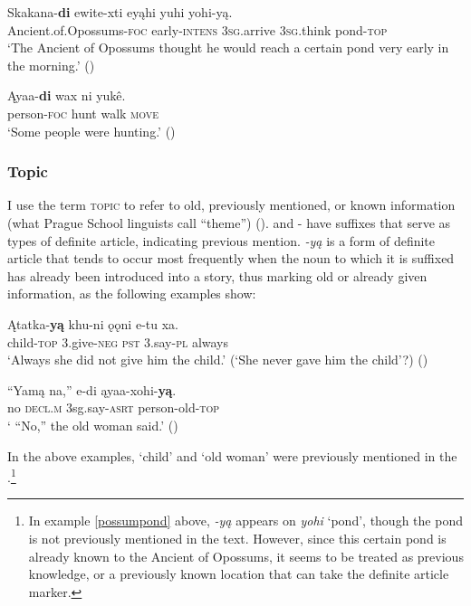 \documentclass[output=paper]{LSP/langsci}
\begin{document}
\ea\label{possumpond}
\gll 	Skakana-\textbf{di} ewite-xti eyąhi yuhi yohi-y\k{a}. \\
	Ancient.of.Opossums-\textsc{foc} early-\textsc{intens} \textsc{3sg}.arrive \textsc{3sg}.think pond-\textsc{top}\\
\glt `The Ancient of Opossums thought he would reach a certain pond very early in the morning.' (\citealt[26]{DorseySwanton1912})
\z

\ea
\gll	Ąyaa-\textbf{di} wax ni yukê. \\
	person-\textsc{foc} hunt walk \textsc{move}\\
\glt `Some people were hunting.' (\citealt[65]{DorseySwanton1912})
\z

\subsubsection{Topic}

I use the term \textsc{topic} to refer to old, previously mentioned, or known information (what Prague School linguists call “theme”) (\citealt[271]{Payne1997}).  and - have suffixes that serve as types of definite article, indicating previous mention.  \emph{-yą} is a form of definite article that tends to occur most frequently when the noun to which it is suffixed has already been introduced into a story, thus marking old or already given information, as the following examples show: 

\ea
\gll	Ątatka-\textbf{yą } khu-ni 	 ǫǫni e-tu 	 xa.\\ 
child-\textsc{top} 3.give-\textsc{neg} \textsc{pst} 	 3.say-\textsc{pl} always \\
\glt `Always she did not give him the child.' (`She never gave him the child'?) (\citealt[43]{DorseySwanton1912})
\z

\ea
\gll	“Yamą na,” 	 e-di 	 ąyaa-xohi-\textbf{yą}.\\
	\hspace{.6em}no 	\textsc{decl.m} 3sg.say-\textsc{asrt} person-old-\textsc{top} \\
\glt ` ``No,'' the old woman said.' (\citealt[67]{DorseySwanton1912})
\z

In the above examples, `child' and `old woman' were previously mentioned in the .\footnote{In example \ref{possumpond} above, \emph{-yą} appears on \emph{yohi} `pond', though the pond is not previously mentioned in the text. However, since this certain pond is already known to the Ancient of Opossums, it seems to be treated as previous knowledge, or a previously known location that can take the definite article marker.}
\end{document}
